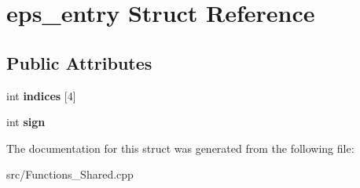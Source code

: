 \hypertarget{structeps__entry}{\section{eps\-\_\-entry Struct Reference}
\label{structeps__entry}
}
\subsection*{Public Attributes}
\begin{DoxyCompactItemize}
\item 
\hypertarget{structeps__entry_aeb23818a8c93790dc84e159e22fece7c}{int {\bfseries indices} \mbox{[}4\mbox{]}}\label{structeps__entry_aeb23818a8c93790dc84e159e22fece7c}

\item 
\hypertarget{structeps__entry_a6557cf0ea08b5afe0e6f525e13934712}{int {\bfseries sign}}\label{structeps__entry_a6557cf0ea08b5afe0e6f525e13934712}

\end{DoxyCompactItemize}


The documentation for this struct was generated from the following file\-:\begin{DoxyCompactItemize}
\item 
src/Functions\-\_\-\-Shared.\-cpp\end{DoxyCompactItemize}
